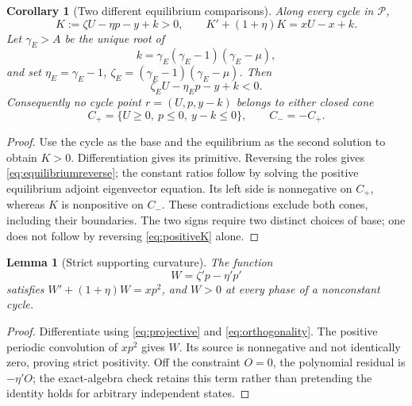\documentclass[11pt,a4paper]{article}
\numberwithin{equation}{section}
\newtheorem{lemma}[theorem]{Lemma}
\newtheorem{corollary}[theorem]{Corollary}
\theoremstyle{remark}\newtheorem{remark}[theorem]{Remark}
\newcommand{\cP}{\mathcal P}
\begin{document}
\begin{corollary}[Two different equilibrium comparisons]\label{cor:cones}
Along every cycle in $\cP$,
\begin{equation}\label{eq:positiveK}
K:=\zeta U-\eta p-y+k>0,\qquad
K'+(1+\eta)K=xU-x+k.
\end{equation}
Let $\gamma_E>A$ be the unique root of
\[
k=\gamma_E(\gamma_E-1)(\gamma_E-\mu),
\]
and set $\eta_E=\gamma_E-1$, $\zeta_E=(\gamma_E-1)(\gamma_E-\mu)$. Then
\begin{equation}\label{eq:equilibriumreverse}
\zeta_EU-\eta_Ep-y+k<0.
\end{equation}
Consequently no cycle point $r=(U,p,y-k)$ belongs to either closed cone
\begin{equation}\label{eq:cones}
C_+=\{U\ge0,\ p\le0,\ y-k\le0\},\qquad C_-=-C_+.
\end{equation}
\end{corollary}
\begin{proof}
Use the cycle as the base and the equilibrium as the second solution to obtain $K>0$. Differentiation gives its primitive. Reversing the roles gives \eqref{eq:equilibriumreverse}; the constant ratios follow by solving the positive equilibrium adjoint eigenvector equation. Its left side is nonnegative on $C_+$, whereas $K$ is nonpositive on $C_-$. These contradictions exclude both cones, including their boundaries. The two signs require two distinct choices of base; one does not follow by reversing \eqref{eq:positiveK} alone.
\end{proof}

\begin{lemma}[Strict supporting curvature]\label{lem:curvature}
The function
\begin{equation}\label{eq:curvature}
W=\zeta'p-\eta'p'
\end{equation}
satisfies $W'+(1+\eta)W=xp^2$, and $W>0$ at every phase of a nonconstant cycle.
\end{lemma}
\begin{proof}
Differentiate using \eqref{eq:projective} and \eqref{eq:orthogonality}. The positive periodic convolution of $xp^2$ gives $W$. Its source is nonnegative and not identically zero, proving strict positivity. Off the constraint $O=0$, the polynomial residual is $-\eta'O$; the exact-algebra check retains this term rather than pretending the identity holds for arbitrary independent states.
\end{proof}
\end{document}
